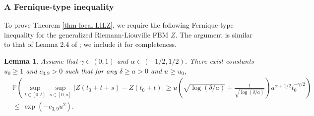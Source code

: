 \documentclass[11pt, reqno]{amsart}
\numberwithin{equation}{section}
\newtheorem{lemma}{Lemma}[section]
\newcommand{\1}{{\bf 1}}
\newcommand{\2}{{\bf 2}}
\begin{document}
\subsubsection{A Fernique-type inequality}
To prove Theorem  \ref{thm local LILZ},  we require the 
following  Fernique-type inequality for the generalized 
Riemann-Liouville FBM $Z$. The argument   is similar to that 
of Lemma 2.4 of \cite{WSX2020};  we include it for completeness.

\begin{lemma}\label{Lem: Fernique}  {Assume that   $\gamma\in (0, 1)$ and $\alpha\in (-1/2,1/2)$}. 
There exist constants $u_0\ge1$ and $c_{3,9}>0$ such that for any $\delta\ge a>0$  and  $u\ge u_0$,
\begin{equation*}\label{eq Fernique}
\begin{split}
&\mathbb P\left(\sup_{t\in [0,  \delta]}\sup_{s\in [0,a]} \left|Z(t_0+t+s)-Z(t_0+t) \right|\ge u\left(\sqrt{\log(\delta/a)}
+\frac{1}{\sqrt{\log(\delta/a)}} \right) a ^{\alpha+1/2}  t_0^{-\gamma/2}\right)\\
&\le\,  \exp\left(-c_{3,9} u^2\right).
\end{split}
\end{equation*}
 \end{lemma}
\end{document}
